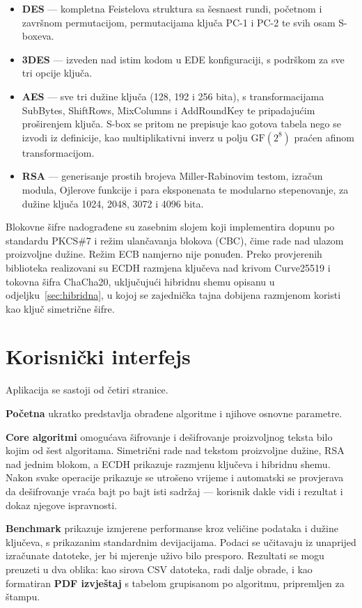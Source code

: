 \begin{itemize}
  \item \textbf{DES} --- kompletna Feistelova struktura sa šesnaest rundi, početnom i završnom permutacijom, permutacijama ključa PC-1 i PC-2 te svih osam S-boxeva.
  \item \textbf{3DES} --- izveden nad istim kodom u EDE konfiguraciji, s podrškom za sve tri opcije ključa.
  \item \textbf{AES} --- sve tri dužine ključa (128, 192 i 256 bita), s transformacijama SubBytes, ShiftRows, MixColumns i AddRoundKey te pripadajućim proširenjem ključa. S-box se pritom ne prepisuje kao gotova tabela nego se izvodi iz definicije, kao multiplikativni inverz u polju $\mathrm{GF}(2^8)$ praćen afinom transformacijom.
  \item \textbf{RSA} --- generisanje prostih brojeva Miller-Rabinovim testom, izračun modula, Ojlerove funkcije i para eksponenata te modularno stepenovanje, za dužine ključa 1024, 2048, 3072 i 4096 bita.
\end{itemize}

Blokovne šifre nadograđene su zasebnim slojem koji implementira dopunu po standardu PKCS\#7 i režim ulančavanja blokova (CBC), čime rade nad ulazom proizvoljne dužine. Režim ECB namjerno nije ponuđen. Preko provjerenih biblioteka realizovani su ECDH razmjena ključeva nad krivom Curve25519 i tokovna šifra ChaCha20, uključujući hibridnu shemu opisanu u odjeljku~\ref{sec:hibridna}, u kojoj se zajednička tajna dobijena razmjenom koristi kao ključ simetrične šifre.

\section{Korisnički interfejs}
\label{sec:interfejs}

Aplikacija se sastoji od četiri stranice.

\textbf{Početna} ukratko predstavlja obrađene algoritme i njihove osnovne parametre.

\textbf{Core algoritmi} omogućava šifrovanje i dešifrovanje proizvoljnog teksta bilo kojim od šest algoritama. Simetrični rade nad tekstom proizvoljne dužine, RSA nad jednim blokom, a ECDH prikazuje razmjenu ključeva i hibridnu shemu. Nakon svake operacije prikazuje se utrošeno vrijeme i automatski se provjerava da dešifrovanje vraća bajt po bajt isti sadržaj --- korisnik dakle vidi i rezultat i dokaz njegove ispravnosti.

\textbf{Benchmark} prikazuje izmjerene performanse kroz veličine podataka i dužine ključeva, s prikazanim standardnim devijacijama. Podaci se učitavaju iz unaprijed izračunate datoteke, jer bi mjerenje uživo bilo presporo. Rezultati se mogu preuzeti u dva oblika: kao sirova CSV datoteka, radi dalje obrade, i kao formatiran \textbf{PDF izvještaj} s tabelom grupisanom po algoritmu, pripremljen za štampu.

